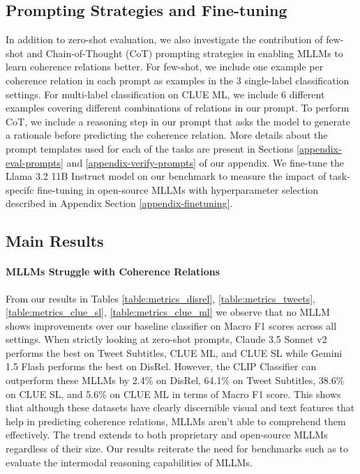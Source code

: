 \subsection{Prompting Strategies and Fine-tuning} \label{prompt-strategies}
In addition to zero-shot evaluation, we also investigate the contribution of few-shot and Chain-of-Thought (CoT) prompting strategies in enabling MLLMs to learn coherence relations better. For few-shot, we include one example per coherence relation in each prompt as examples in the 3 single-label classification settings. For multi-label classification on CLUE ML, we include 6 different examples covering different combinations of relations in our prompt. To perform CoT, we include a reasoning step in our prompt that asks the model to generate a rationale before predicting the coherence relation. More details about the prompt templates used for each of the tasks are present in Sections \ref{appendix-eval-prompts} and \ref{appendix-verify-prompts} of our appendix. We fine-tune the Llama 3.2 11B Instruct model on our benchmark to measure the impact of task-specifc fine-tuning in open-source MLLMs with hyperparameter selection described in Appendix Section \ref{appendix-finetuning}.

\subsection{Main Results}

\paragraph{MLLMs Struggle with Coherence Relations}
From our results in Tables \ref{table:metrics_disrel}, \ref{table:metrics_tweets}, \ref{table:metrics_clue_sl}, \ref{table:metrics_clue_ml} we observe that no MLLM shows improvements over our baseline classifier on Macro F1 scores across all settings. When strictly looking at zero-shot prompts, Claude 3.5 Sonnet v2 performs the best on Tweet Subtitles, CLUE ML, and CLUE SL while Gemini 1.5 Flash performs the best on DisRel. However, the CLIP Classifier can outperform these MLLMs by 2.4\% on DisRel, 64.1\% on Tweet Subtitles, 38.6\% on CLUE SL, and 5.6\% on CLUE ML in terms of Macro F1 score. This shows that although these datasets have clearly discernible visual and text features that help in predicting coherence relations, MLLMs aren't able to comprehend them effectively. The trend extends to both proprietary and open-source MLLMs regardless of their size. Our results reiterate the need for benchmarks such as {\name} to evaluate the intermodal reasoning capabilities of MLLMs.

